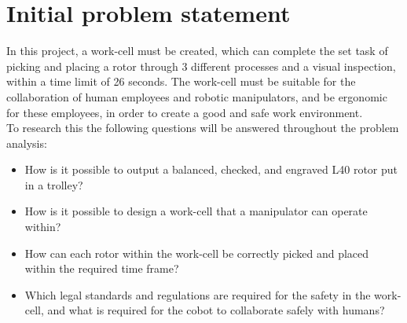 
\newpage
\section{Initial problem statement}\label{ch:Initial problem statment}


In this project, a work-cell must be created, which can complete the set task of picking and placing a rotor through 3 different processes and a visual inspection, within a time limit of 26 seconds. The work-cell must be suitable for the collaboration of human employees and robotic manipulators, and be ergonomic for these employees, in order to create a good and safe work environment. \\
To research this the following questions will be answered throughout the problem analysis:

\begin{itemize}

    \item How is it possible to output a balanced, checked, and engraved L40 rotor put in a trolley?
    \item How is it possible to design a work-cell that a manipulator can operate within?
    \item How can each rotor within the work-cell be correctly picked and placed within the required time frame?
    \item  Which legal standards and regulations are required for the safety in the work-cell, and what is required for the cobot to collaborate safely with humans?
\end{itemize}

